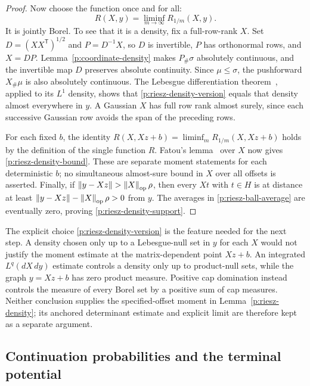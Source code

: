 \begin{proof}
Now choose the function once and for all:
\begin{equation}\label{p:riesz-density-version}
 R(X,y)=\liminf_{m\to\infty}R_{1/m}(X,y).
\end{equation}
It is jointly Borel. To see that it is a density, fix a full-row-rank
$X$. Set $D=(XX^{\mathsf T})^{1/2}$ and $P=D^{-1}X$, so $D$ is invertible,
$P$ has orthonormal rows, and $X=DP$.
Lemma~\ref{p:coordinate-density} makes $P_\#\sigma$ absolutely
continuous, and the invertible map $D$ preserves absolute continuity.
Since $\mu\le\sigma$, the pushforward $X_\#\mu$ is also absolutely
continuous. The Lebesgue differentiation
theorem~\cite[Theorem~1.6.19]{TaoMeasure2011}, applied to its
$L^1$ density, shows that
\eqref{p:riesz-density-version} equals that density almost
everywhere in $y$.  A Gaussian $X$ has full row rank almost
surely, since each successive Gaussian row avoids the span of
the preceding rows.

For each fixed $b$, the identity
$R(X,Xz+b)=\liminf_m R_{1/m}(X,Xz+b)$ holds by the definition of
the single function $R$.  Fatou's
lemma~\cite[Corollary~1.4.47]{TaoMeasure2011} over $X$ now gives
\eqref{p:riesz-density-bound}.  These are separate moment
statements for each deterministic $b$; no simultaneous
almost-sure bound in $X$ over all offsets is asserted.  Finally,
if $\left\lVert y-Xz\right\rVert>\left\lVert X\right\rVert_{\mathrm{op}}\rho$, then every $Xt$ with
$t\in H$ is at distance at least
$\left\lVert y-Xz\right\rVert-\left\lVert X\right\rVert_{\mathrm{op}}\rho>0$ from $y$.  The averages in
\eqref{p:riesz-ball-average} are eventually zero, proving
\eqref{p:riesz-density-support}.
\end{proof}

The explicit choice \eqref{p:riesz-density-version} is the feature
needed for the next step. A density chosen only up to a
Lebesgue-null set in $y$ for each $X$ would not justify the moment
estimate at the matrix-dependent point $Xz+b$.
An integrated $L^q(dX\,dy)$ estimate controls a density only up to
product-null sets, while the graph $y=Xz+b$ has zero product measure.
Positive cap domination instead controls the measure of every Borel
set by a positive sum of cap measures.  Neither conclusion supplies
the specified-offset moment in Lemma~\ref{p:riesz-density}; its
anchored determinant estimate and explicit limit are therefore kept
as a separate argument.

\subsection{Continuation probabilities and the terminal potential}

